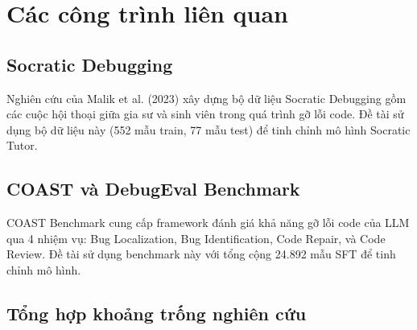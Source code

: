\section{Các công trình liên quan}

\subsection{Socratic Debugging}

Nghiên cứu của Malik et al. (2023) \cite{socratic_debug} xây dựng bộ dữ liệu Socratic Debugging gồm các cuộc hội thoại giữa gia sư và sinh viên trong quá trình gỡ lỗi code. Đề tài sử dụng bộ dữ liệu này (552 mẫu train, 77 mẫu test) để tinh chỉnh mô hình Socratic Tutor.

\subsection{COAST và DebugEval Benchmark}

COAST Benchmark \cite{coast} cung cấp framework đánh giá khả năng gỡ lỗi code của LLM qua 4 nhiệm vụ: Bug Localization, Bug Identification, Code Repair, và Code Review. Đề tài sử dụng benchmark này với tổng cộng 24.892 mẫu SFT để tinh chỉnh mô hình.

\subsection{Tổng hợp khoảng trống nghiên cứu}

\begin{table}[h]
\centering
\renewcommand{\arraystretch}{1.3}
\caption{So sánh với các công trình liên quan}
\label{tab:gap}
\end{table}
